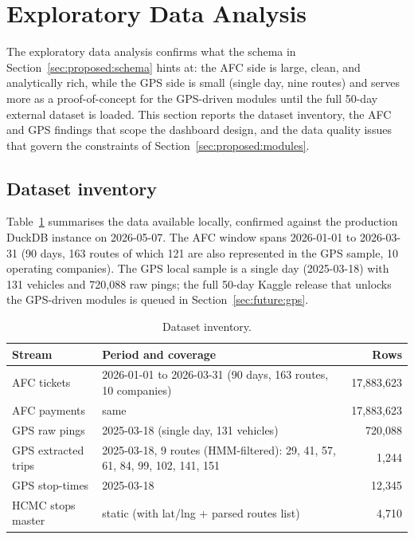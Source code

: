 \section{Exploratory Data Analysis}
\label{sec:proposed:eda}

The exploratory data analysis confirms what the schema in
Section~\ref{sec:proposed:schema} hints at: the AFC side is large,
clean, and analytically rich, while the GPS side is small (single
day, nine routes) and serves more as a proof-of-concept for the
GPS-driven modules until the full 50-day external dataset is
loaded. This section reports the dataset inventory, the AFC and
GPS findings that scope the dashboard design, and the data quality
issues that govern the constraints of
Section~\ref{sec:proposed:modules}.

\subsection{Dataset inventory}

Table~\ref{tab:proposed:dataset} summarises the data available
locally, confirmed against the production DuckDB instance on
2026-05-07. The AFC window spans 2026-01-01 to 2026-03-31 (90
days, 163 routes of which 121 are also represented in the GPS
sample, 10 operating companies). The GPS local sample is a
single day (2025-03-18) with 131 vehicles and 720{,}088 raw pings;
the full 50-day Kaggle release that unlocks the GPS-driven modules
is queued in Section~\ref{sec:future:gps}.

\begin{table}[H]
\centering
\caption{Dataset inventory.}
\label{tab:proposed:dataset}
\begin{tabularx}{\linewidth}{lXr}
\hline
Stream & Period and coverage & Rows \\
\hline
AFC tickets        & 2026-01-01 to 2026-03-31 (90 days, 163 routes, 10 companies) & 17{,}883{,}623 \\
AFC payments       & same                                                          & 17{,}883{,}623 \\
GPS raw pings      & 2025-03-18 (single day, 131 vehicles)                         &    720{,}088 \\
GPS extracted trips& 2025-03-18, 9 routes (HMM-filtered): 29, 41, 57, 61, 84, 99, 102, 141, 151 &      1{,}244 \\
GPS stop-times     & 2025-03-18                                                    &     12{,}345 \\
HCMC stops master  & static (with lat/lng + parsed routes list)                    &      4{,}710 \\
\hline
\end{tabularx}
\end{table}

